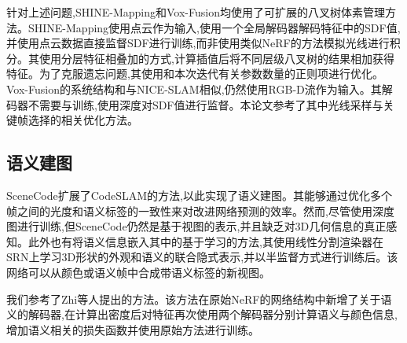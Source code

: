 针对上述问题,SHINE-Mapping\cite{shine}和Vox-Fusion\cite{vox}均使用了可扩展的八叉树体素管理方法。SHINE-Mapping使用点云作为输入,使用一个全局解码器解码特征中的SDF值,并使用点云数据直接监督SDF进行训练,而非使用类似NeRF的方法模拟光线进行积分。其使用分层特征相叠加的方式,计算插值后将不同层级八叉树的结果相加获得特征。为了克服遗忘问题,其使用和本次迭代有关参数数量的正则项进行优化。Vox-Fusion的系统结构和与NICE-SLAM相似,仍然使用RGB-D流作为输入。其解码器不需要与训练,使用深度对SDF值进行监督。本论文参考了其中光线采样与关键帧选择的相关优化方法。

\subsection{语义建图}
SceneCode\cite{scenecode}扩展了CodeSLAM的方法,以此实现了语义建图。其能够通过优化多个帧之间的光度和语义标签的一致性来对改进网络预测的效率。然而,尽管使用深度图进行训练,但SceneCode仍然是基于视图的表示,并且缺乏对3D几何信息的真正感知。此外也有将语义信息嵌入其中的基于学习的方法\cite{semantic2},其使用线性分割渲染器在SRN上学习3D形状的外观和语义的联合隐式表示,并以半监督方式进行训练后。该网络可以从颜色或语义帧中合成带语义标签的新视图。

我们参考了Zhi等人提出的方法\cite{sem_nerf}。该方法在原始NeRF的网络结构中新增了关于语义的解码器,在计算出密度后对特征再次使用两个解码器分别计算语义与颜色信息,增加语义相关的损失函数并使用原始方法进行训练。